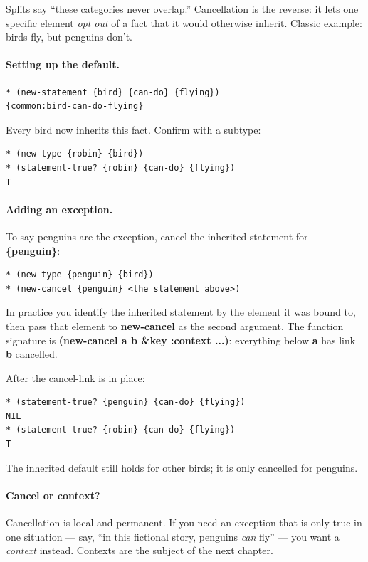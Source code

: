 \documentclass[titlepage,twoside,openright,11pt]{article}
\begin{document}
Splits say ``these categories never overlap.'' Cancellation is the
reverse: it lets one specific element \emph{opt out} of a fact that
it would otherwise inherit. Classic example: birds fly, but
penguins don't.

\paragraph{Setting up the default.}

\begin{verbatim}
* (new-statement {bird} {can-do} {flying})
{common:bird-can-do-flying}
\end{verbatim}

Every bird now inherits this fact. Confirm with a subtype:

\begin{verbatim}
* (new-type {robin} {bird})
* (statement-true? {robin} {can-do} {flying})
T
\end{verbatim}

\paragraph{Adding an exception.}
To say penguins are the exception, cancel the inherited statement
for \textbf{\{penguin\}}:

\begin{verbatim}
* (new-type {penguin} {bird})
* (new-cancel {penguin} <the statement above>)
\end{verbatim}

In practice you identify the inherited statement by the element it
was bound to, then pass that element to \textbf{new-cancel} as the
second argument. The function signature is
\textbf{(new-cancel a b \&key :context ...)}: everything below
\textbf{a} has link \textbf{b} cancelled.

After the cancel-link is in place:

\begin{verbatim}
* (statement-true? {penguin} {can-do} {flying})
NIL
* (statement-true? {robin} {can-do} {flying})
T
\end{verbatim}

The inherited default still holds for other birds; it is only
cancelled for penguins.

\paragraph{Cancel or context?}
Cancellation is local and permanent. If you need an exception that
is only true in one situation --- say, ``in this fictional story,
penguins \emph{can} fly'' --- you want a \emph{context} instead.
Contexts are the subject of the next chapter.
\end{document}
